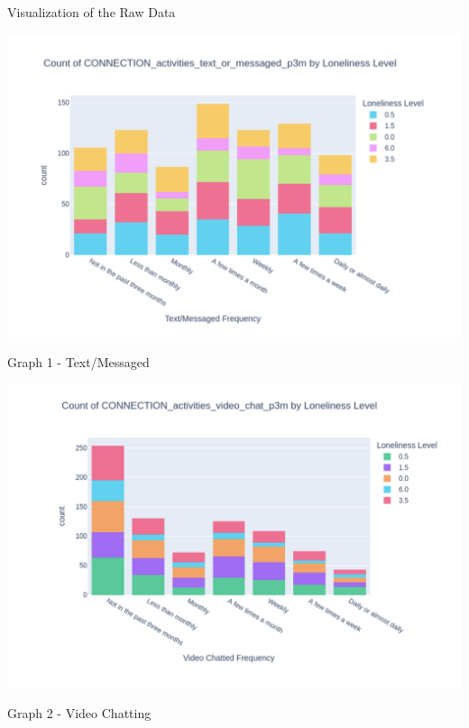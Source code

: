 \documentclass{beamer}
\begin{document}
\begin{frame}{Visualization of the Raw Data}

\begin{minipage}[t]{0.51\linewidth} %
    \includegraphics[width=\linewidth]{Screenshot 2024-11-28 at 12.28.29 PM.png}
    \caption{Graph 1 - Text/Messaged} %
\end{minipage}%
\hspace{-1em} %
\begin{minipage}[t]{0.51\linewidth} %
    \includegraphics[width=\linewidth]{Screenshot 2024-11-28 at 12.31.04 PM.png}
    \caption{Graph 2 - Video Chatting} %
\end{minipage}

\end{frame}
\end{document}
